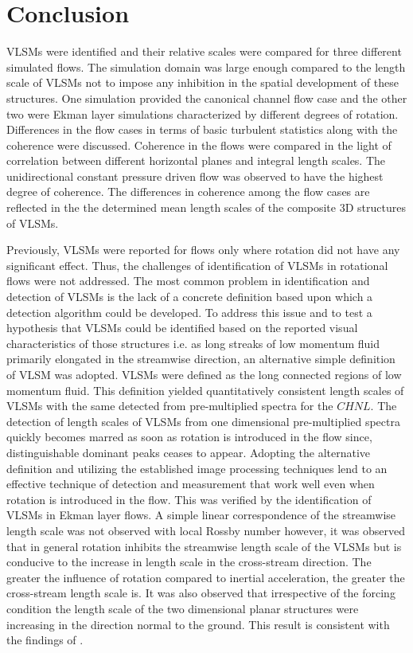 \documentclass{svjour3}                     %
\begin{document}
\section{Conclusion}
VLSMs were identified and their relative scales were compared for three different simulated flows. The simulation domain was large enough compared to the length scale of VLSMs not to impose any inhibition in the spatial development of these structures. One simulation provided the canonical channel flow case and the other two were Ekman layer simulations characterized by different degrees of rotation. Differences in the flow cases in terms of basic turbulent statistics along with the coherence were discussed. Coherence in the flows were compared in the light of correlation between different horizontal planes and integral length scales. The unidirectional constant pressure driven flow was observed to have the highest degree of coherence. The differences in coherence among the flow cases are reflected in the the determined mean length scales of the composite 3D structures of VLSMs.

Previously, VLSMs were reported for flows only where rotation did not have any significant effect. Thus, the challenges of identification of VLSMs in rotational flows were not addressed. The most common problem in identification and detection of VLSMs is the lack of a concrete definition based upon which a detection algorithm could be developed. To address this issue and to test a hypothesis that VLSMs could be identified based on the reported visual characteristics of those structures i.e. as long streaks of low momentum fluid primarily elongated in the streamwise direction, an alternative simple definition of VLSM was adopted. VLSMs were defined as the long connected regions of low momentum fluid. This definition yielded quantitatively consistent length scales of VLSMs with the same detected from pre-multiplied spectra for the $CHNL$. The detection of length scales of VLSMs from one dimensional pre-multiplied spectra quickly becomes marred as soon as rotation is introduced in the flow since, distinguishable dominant peaks ceases to appear. Adopting the alternative definition and utilizing the established image processing techniques lend to an effective technique of detection and measurement that work well even when rotation is introduced in the flow. This was verified by the identification of VLSMs in Ekman layer flows. A simple linear correspondence of the streamwise length scale was not observed with local Rossby number however, it was observed that in general rotation inhibits the streamwise length scale of the VLSMs but is conducive to the increase in length scale in the cross-stream direction. The greater the influence of rotation compared to inertial acceleration, the greater the cross-stream length scale is. It was also observed that irrespective of the forcing condition the length scale of the two dimensional planar structures were increasing in the direction normal to the ground. This result is consistent with the findings of \citet{de_silva_hutchins_jfm_2016}. 



\end{document}
